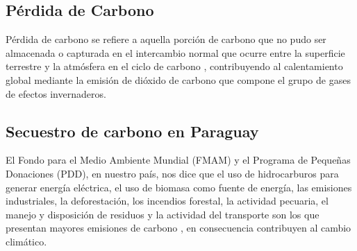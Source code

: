 \subsection{P\'erdida de Carbono}
P\'erdida de carbono se refiere a aquella porci\'on de carbono que no pudo ser almacenada o capturada en el intercambio normal que ocurre entre la superficie terrestre y la atm\'osfera en el ciclo de carbono \cite{marquezestimacion}, contribuyendo al calentamiento global mediante la emisi\'on de di\'oxido de carbono que compone el grupo de gases de efectos invernaderos.
\subsection{Secuestro de carbono en Paraguay}
El Fondo para el Medio Ambiente Mundial (FMAM) y el Programa de Peque\~{n}as Donaciones (PDD), en nuestro pa\'is, nos dice que el uso de hidrocarburos para generar energ\'ia el\'ectrica, el uso de biomasa como fuente de energ\'ia, las emisiones industriales, la deforestaci\'on, los incendios forestal, la actividad pecuaria, el manejo y disposici\'on de residuos y la actividad del transporte son los que presentan mayores emisiones de carbono \cite{cecilia2010Proyecto}, en consecuencia contribuyen al cambio clim\'atico.
